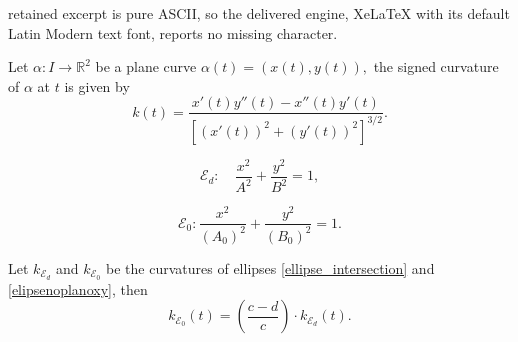 \documentclass[10pt,a4paper]{amsart}
\begin{document}
retained excerpt is pure ASCII, so the delivered engine, XeLaTeX with its default Latin Modern text font, reports no missing character.
\begin{definition}
	Let $\alpha: I \longrightarrow \mathbb{R}^2$ be a plane curve $\alpha(t)=(x(t), y(t)),$ the signed curvature of $\alpha$ at $t$ is given by
	\begin{equation}\label{definicao curvatura}
		k(t) = \dfrac{x'(t) y''(t) - x''(t) y'(t)}{[ (x'(t))^2 + (y'(t))^2 ]^{3/2}}.   
	\end{equation}
\end{definition}

\begin{equation}\label{ellipse_intersection}
	\mathcal{E}_d: \quad \dfrac{x^2}{A^2} + \dfrac{y^2}{B^2} = 1,
\end{equation}

	\begin{equation}\label{elipsenoplanoxy}
		\mathcal{E}_0 :   \dfrac{x^2}{(A_0)^2} + \dfrac{y^2}{(B_0)^2} = 1.
	\end{equation}

\begin{theorem}\label{teorema3}
	Let $k_{\mathcal{E}_d}$ and $k_{\mathcal{E}_0}$ be the curvatures of ellipses \eqref{ellipse_intersection} and \eqref{elipsenoplanoxy}, then
	$$
	k_{\mathcal{E}_0}(t) =  \left(\dfrac{c-d}{c} \right) \cdot k_{\mathcal{E}_d}(t).
	$$
\end{theorem}
\end{document}
